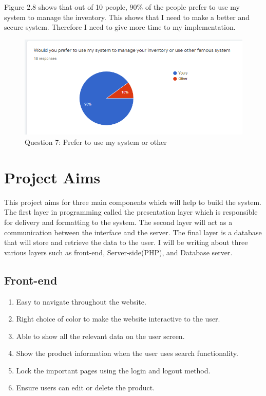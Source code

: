 \newpage
Figure 2.8 shows that out of 10 people, 90\% of the people prefer to use my system to manage the inventory. This shows that I need to make a better and secure system. Therefore I need to give more time to my implementation.

\begin{figure}[h]
\centering
    \includegraphics[scale=0.7]
    {images/SurveyQue7.png}
    \caption{Question 7: Prefer to use my system or other}
    \label{fig: Question 7: Prefer to use my system or other}
\end{figure}

\section{Project Aims}
This project aims for three main components which will help to build the system. The first layer in programming called the presentation layer which is responsible for delivery and formatting to the system. The second layer will act as a communication between the interface and the server. The final layer is a database that will store and retrieve the data to the user. I will be writing about three various layers such as front-end, Server-side(PHP), and Database server.

\subsection{Front-end}
\begin{enumerate}
    \item Easy to navigate throughout the website.
    \item Right choice of color to make the website interactive to the user.
    \item Able to show all the relevant data on the user screen.
    \item Show the product information when the user uses search functionality.
    \item Lock the important pages using the login and logout method.
    \item Ensure users can edit or delete the product.
\end{enumerate}

